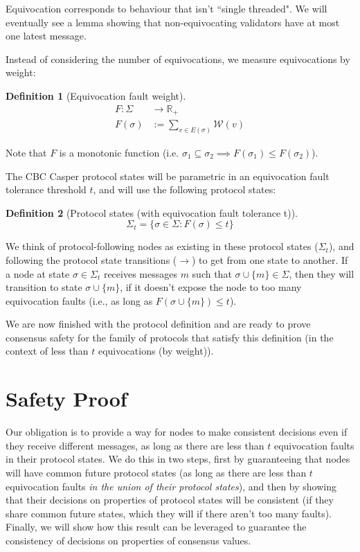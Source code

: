 \documentclass{article}
\theoremstyle{definition}
\newtheorem{defn}{Definition}[section]
\begin{document}
Equivocation corresponds to behaviour that isn't ``single threaded". We will eventually see a lemma showing that non-equivocating validators have at most one latest message.

Instead of considering the number of equivocations, we measure equivocations by weight:

\begin{defn}[Equivocation fault weight]
\begin{align}
F: \Sigma &\to \mathbb{R}_+ \\
F(\sigma) &:= \sum_{v \in E(\sigma)} \mathcal{W}(v)
\end{align}
\end{defn}

Note that $F$ is a monotonic function (i.e. $\sigma_1 \subseteq \sigma_2 \implies F(\sigma_1) \leq F(\sigma_2)$).

The CBC Casper protocol states will be parametric in an equivocation fault tolerance threshold $t$, and will use the following protocol states:

\begin{defn}[Protocol states (with equivocation fault tolerance t)]
$$
\Sigma_t = \{\sigma \in \Sigma : F(\sigma) \leq t\}
$$
\end{defn}

We think of protocol-following nodes as existing in these protocol states ($\Sigma_t$), and following the protocol state transitions ($\to$) to get from one state to another. If a node at state $\sigma \in \Sigma_t$ receives messages $m$ such that $\sigma \cup \{m\} \in \Sigma$, then they will transition to state $\sigma \cup \{m\}$, if it doesn't expose the node to too many equivocation faults (i.e., as long as $F(\sigma \cup \{m\}) \leq t$).

We are now finished with the protocol definition and are ready to prove consensus safety for the family of protocols that satisfy this definition (in the context of less than $t$ equivocations (by weight)).

\pagebreak
\section{Safety Proof}

Our obligation is to provide a way for nodes to make consistent decisions even if they receive different messages, as long as there are less than $t$ equivocation faults in their protocol states. We do this in two steps, first by guaranteeing that nodes will have common future protocol states (as long as there are less than $t$ equivocation faults \emph{in the union of their protocol states}), and then by showing that their decisions on properties of protocol states will be consistent (if they share common future states, which they will if there aren't too many faults). Finally, we will show how this result can be leveraged to guarantee the consistency of decisions on properties of consensus values.
\end{document}
